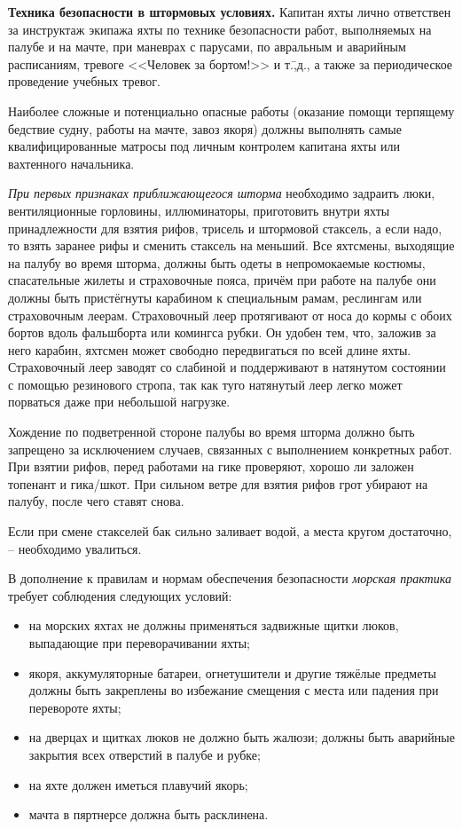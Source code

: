 \textbf{Техника безопасности в штормовых условиях.} Капитан яхты лично
ответствен за инструктаж экипажа яхты по технике безопасности работ,
выполняемых на палубе и на мачте, при маневрах с парусами, по
авральным и аварийным расписаниям, тревоге <<Человек за бортом!>> и
т.\=,д., а также за периодическое проведение учебных тревог.

Наиболее сложные и потенциально опасные работы (оказание помощи
терпящему бедствие судну, работы на мачте, завоз якоря) должны
выполнять самые квалифицированные матросы под личным контролем
капитана яхты или вахтенного начальника.

\textit{При первых признаках приближающегося шторма} необходимо
задраить люки, вентиляционные горловины, иллюминаторы, приготовить
внутри яхты принадлежности для взятия рифов, трисель и штормовой
стаксель, а если надо, то взять заранее рифы и сменить стаксель на
меньший. Все яхтсмены, выходящие на палубу во время шторма, должны
быть одеты в непромокаемые костюмы, спасательные жилеты и страховочные
пояса, причём при работе на палубе они должны быть пристёгнуты
карабином к специальным рамам, реслингам или страховочным
леерам. Страховочный леер протягивают от носа до кормы с обоих бортов
вдоль фальшборта или комингса рубки. Он удобен тем, что, заложив за
него карабин, яхтсмен может свободно передвигаться по всей длине
яхты. Страховочный леер заводят со слабиной и поддерживают в натянутом
состоянии с помощью резинового стропа, так как туго натянутый леер
легко может порваться даже при небольшой нагрузке.

Хождение по подветренной стороне палубы во время шторма должно быть
запрещено за исключением случаев, связанных с выполнением конкретных
работ. При взятии рифов, перед работами на гике проверяют, хорошо ли
заложен топенант и гика\-/шкот. При сильном ветре для взятия рифов
грот убирают на палубу, после чего ставят снова.

Если при смене стакселей бак сильно заливает водой, а места кругом
достаточно, \--- необходимо увалиться.

В дополнение к правилам и нормам обеспечения безопасности \textit{морская
практика} требует соблюдения следующих условий:
\begin{itemize}
\item на морских яхтах не должны применяться задвижные щитки люков,
  выпадающие при переворачивании яхты;
\item якоря, аккумуляторные батареи, огнетушители и другие тяжёлые
  предметы должны быть закреплены во избежание смещения с места или
  падения при перевороте яхты;
\item на дверцах и щитках люков не должно быть жалюзи; должны быть
  аварийные закрытия всех отверстий в палубе и рубке;
\item на яхте должен иметься плавучий якорь;
\item мачта в пяртнерсе должна быть расклинена. 
\end{itemize}


